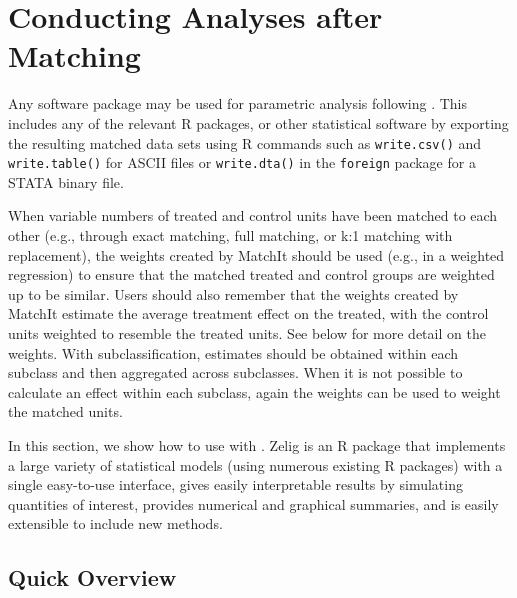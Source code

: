 \section{Conducting Analyses after Matching}
\label{sec:analysis}

Any software package may be used for parametric analysis following
\MatchIt.  This includes any of the relevant R packages, or other
statistical software by exporting the resulting matched data sets
using R commands such as {\tt write.csv()} and {\tt write.table()} for
ASCII files or {\tt write.dta()} in the {\tt foreign} package for a
STATA binary file.

When variable numbers of treated and control units have been matched to each other
(e.g., through exact matching, full matching, or k:1 matching with replacement), the weights
created by MatchIt should be used (e.g., in a weighted regression) to ensure that the matched treated and control groups
are weighted up to be similar.  Users should also remember that the weights
created by MatchIt estimate the average treatment effect on the treated, with
the control units weighted to resemble the treated units.  See below for more detail on the weights.  
With subclassification, estimates should be obtained within each subclass
and then aggregated across subclasses.  When it is not possible to calculate an effect within each subclass,
again the weights can be used to weight the matched units.

In this section, we show how to use
 with \MatchIt.  Zelig
\citep{ImaKinLau06} is an R package that implements a large variety of
statistical models (using numerous existing R packages) with a single
easy-to-use interface, gives easily interpretable results by
simulating quantities of interest, provides numerical and graphical
summaries, and is easily extensible to include new methods.

\subsection{Quick Overview}

